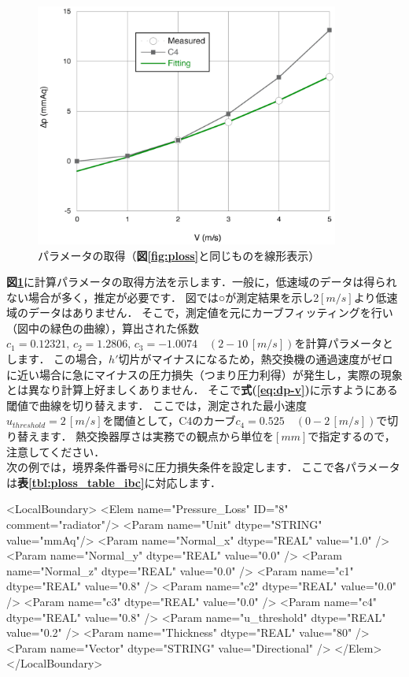 \begin{figure}[htdp]
\begin{center}
\includegraphics[width=10cm,clip]{rad_para.eps}
\caption{パラメータの取得（\textbf{図\ref{fig:ploss}}と同じものを線形表示）}
\label{fig:get_para}
\end{center}
\end{figure}

\textbf{図\ref{fig:get_para}}に計算パラメータの取得方法を示します．一般に，低速域のデータは得られない場合が多く，推定が必要です．
図では○が測定結果を示し2$[m/s]$より低速域のデータはありません．
そこで，測定値を元にカーブフィッティングを行い（図中の緑色の曲線），算出された係数$c_{1}=0.12321,\,c_{2}=1.2806,\,c_{3}=-1.0074\quad(2-10\,[m/s])$を計算パラメータとします．
この場合，$h'$切片がマイナスになるため，熱交換機の通過速度がゼロに近い場合に急にマイナスの圧力損失（つまり圧力利得）が発生し，実際の現象とは異なり計算上好ましくありません．
そこで\textbf{式(\ref{eq:dp-v})}に示すようにある閾値で曲線を切り替えます．
ここでは，測定された最小速度$u_{threshold}=2\,[m/s]$を閾値として，C4のカーブ$c_{4}=0.525\quad(0-2\,[m/s])$で切り替えます．
熱交換器厚さは実務での観点から単位を$[mm]$で指定するので，注意してください．\\

次の例では，境界条件番号8に圧力損失条件を設定します．
ここで各パラメータは\textbf{表\ref{tbl:ploss_table_ibc}}に対応します．

{\small
\begin{program}
<LocalBoundary>
  <Elem name="Pressure_Loss" ID="8" comment="radiator"/>
    <Param name="Unit"        dtype="STRING" value="mmAq"/>
    <Param name="Normal_x"    dtype="REAL"   value="1.0" />
    <Param name="Normal_y"    dtype="REAL"   value="0.0" />
    <Param name="Normal_z"    dtype="REAL"   value="0.0" />
    <Param name="c1"          dtype="REAL"   value="0.8" />
    <Param name="c2"          dtype="REAL"   value="0.0" />
    <Param name="c3"          dtype="REAL"   value="0.0" />
    <Param name="c4"          dtype="REAL"   value="0.8" />
    <Param name="u_threshold" dtype="REAL"   value="0.2" />
    <Param name="Thickness"   dtype="REAL"   value="80" />
    <Param name="Vector"      dtype="STRING" value="Directional" />
  </Elem>
</LocalBoundary>
\end{program}
}

